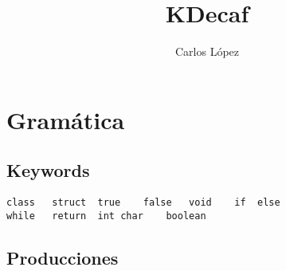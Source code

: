 \documentclass[12pt,letterpaper]{article}
\author{Carlos L\'{o}pez}
\title{KDecaf}
\begin{document}
\maketitle
\section*{Gram\'{a}tica}

\subsection*{Keywords}
\begin{lstlisting}
class	struct	true	false	void	if	else
while	return	int	char	boolean
\end{lstlisting}

\subsection*{Producciones}
\end{document}

